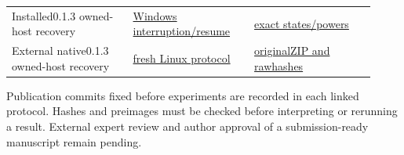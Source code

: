 \documentclass[11pt]{article}
\begin{document}
\begin{small}
\begin{longtable}{@{}p{0.307\linewidth} p{0.307\linewidth} p{0.307\linewidth}@{}}
Installed0.1.3 owned-host recovery & \href{https://github.com/Agnuxo1/Neuro3D/blob/a6d0fbec5011bdc76abad71edac86519016348f4/Docs/INSTALLED\_BLENDER\_HOST\_RECOVERY\_PROTOCOL\_2026-10-09.md}{Windows interruption/resume} & \href{https://github.com/Agnuxo1/Neuro3D/blob/a6d0fbec5011bdc76abad71edac86519016348f4/Docs/validation/installed-blender-host-recovery-2026-10-09/attempt01/evidence\_index.json}{exact states/powers} \\
External native0.1.3 owned-host recovery & \href{https://github.com/Agnuxo1/Neuro3D/blob/a6d0fbec5011bdc76abad71edac86519016348f4/Docs/EXTERNAL\_INSTALLED\_BLENDER\_RECOVERY\_PROTOCOL\_2026-10-09.md}{fresh Linux protocol} & \href{https://github.com/Agnuxo1/Neuro3D/blob/a6d0fbec5011bdc76abad71edac86519016348f4/Docs/validation/external-installed-blender-recovery-2026-10-09/attempt01/evidence\_index.json}{originalZIP and rawhashes} \\
\bottomrule\end{longtable}\end{small}

Publication commits fixed before experiments are recorded in each linked protocol. Hashes and preimages must be checked before interpreting or rerunning a result. External expert review and author approval of a submission-ready manuscript remain pending.
\end{document}
